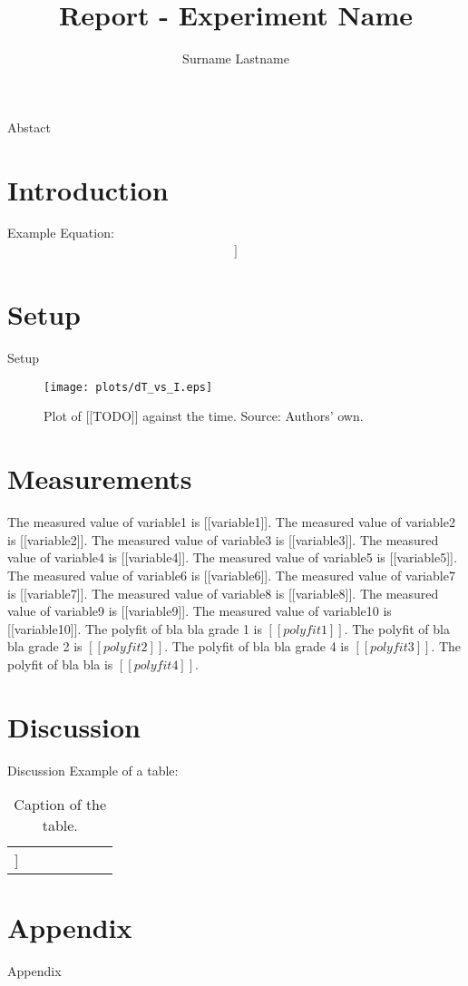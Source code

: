 \documentclass[a4paper]{article}
\author{Surname Lastname}
\title{Report - Experiment Name}
\begin{document}
\maketitle
\abstract 
Abstact
\section{Introduction}
Example Equation:
\begin{align}
[[EQ1]]
\label{eq:Example Equation}
\end{align}
\section{Setup}
Setup

\begin{figure}[H]
\centering
\texttt{[image: plots/dT\_vs\_I.eps]}
\caption{Plot of [[TODO]] against the time. Source: Authors' own.}
\label{fig:text}
\end{figure}

\section{Measurements}
The measured value of variable1 is [[variable1]].
\newline
The measured value of variable2 is [[variable2]].
\newline
The measured value of variable3 is [[variable3]].
\newline
The measured value of variable4 is [[variable4]].
\newline
The measured value of variable5 is [[variable5]].
\newline
The measured value of variable6 is [[variable6]].
\newline
The measured value of variable7 is [[variable7]].
\newline
The measured value of variable8 is [[variable8]].
\newline
The measured value of variable9 is [[variable9]].
\newline
The measured value of variable10 is [[variable10]].
\newline
The polyfit of bla bla grade 1 is $[[polyfit1]]$.
\newline
The polyfit of bla bla grade 2 is $[[polyfit2]]$.
\newline
The polyfit of bla bla grade 4 is $[[polyfit3]]$.
\newline
The polyfit of bla bla is $[[polyfit4]]$.
\newline
\section{Discussion}
Discussion
Example of a table:

\begin{table}[H]
\centering
\begin{tabular}{r|rrrrrr}
\hline
[[table]]
\end{tabular}
\caption{Caption of the table.}
\end{table}

\section{Appendix}
Appendix
\end{document}
